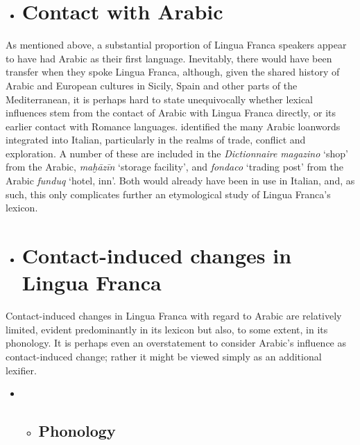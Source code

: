 \documentclass[output=paper]{langsci/langscibook}
\begin{document}
\begin{itemize}
	\item \section{Contact with Arabic}
\end{itemize}

As mentioned above, a substantial proportion of Lingua Franca speakers appear to have had Arabic as their first language. Inevitably, there would have been transfer when they spoke Lingua Franca, although, given the shared history of Arabic and European cultures in Sicily, Spain and other parts of the Mediterranean, it is perhaps hard to state unequivocally whether lexical influences stem from the contact of Arabic with Lingua Franca directly, or its earlier contact with Romance languages. \citet{Pellegrini1972} identified the many Arabic loanwords integrated into Italian, particularly in the realms of trade, conflict and exploration. A number of these are included in the \textit{Dictionnaire}  \textit{magazino} ‘shop’ from the Arabic, \textit{maḫāzīn} ‘storage facility’, and \textit{fondaco} ‘trading post’ from the Arabic \textit{funduq} ‘hotel, inn’. Both would already have been in use in Italian, and, as such, this only complicates further an etymological study of Lingua Franca’s lexicon.\z

\begin{itemize}
	\item \section{Contact-induced changes in Lingua Franca}
\end{itemize}

Contact-induced changes in Lingua Franca with regard to Arabic are relatively limited, evident predominantly in its lexicon but also, to some extent, in its phonology. It is perhaps even an overstatement to consider Arabic’s influence as contact-induced change; rather it might be viewed simply as an additional lexifier.

\begin{itemize}
	\item \begin{itemize}
		\item \subsection{Phonology}
	\end{itemize}
\end{itemize}
\end{document}
